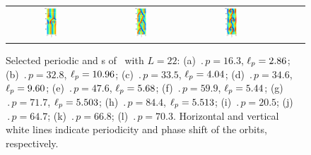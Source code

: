 \begin{figure}[t]
\begin{center}
\begin{tabular}{cccccc}
\includegraphics[width=0.15\textwidth]{figs/ks22rpo084.4-05.51.eps}\hspace{-3ex} &
\includegraphics[width=0.15\textwidth]{figs/ks22rpo064.7-00.00.eps}\hspace{-3ex} &
\includegraphics[width=0.15\textwidth]{figs/ks22rpo070.3-00.00.eps}
\end{tabular}
\end{center}
\caption{Selected periodic and \rpo s of \KSe\ with $L = 22$:
(a) $\period{p} = 16.3$, $\ell_p = 2.86$;
(b) $\period{p} = 32.8$, $\ell_p = 10.96$;
(c) $\period{p} = 33.5$, $\ell_p = 4.04$;
(d) $\period{p} = 34.6$, $\ell_p = 9.60$;
(e) $\period{p} = 47.6$, $\ell_p = 5.68$;
(f) $\period{p} = 59.9$, $\ell_p = 5.44$;
(g) $\period{p} = 71.7$, $\ell_p = 5.503$;
(h) $\period{p} = 84.4$, $\ell_p = 5.513$;
(i) $\period{p} = 20.5$;  (j) $\period{p} = 64.7$;
(k) $\period{p} = 66.8$;  (l) $\period{p} = 70.3$.
Horizontal and vertical white lines indicate periodicity and phase
shift of the orbits, respectively.
}\label{f:ks22rpos}
\end{figure}


